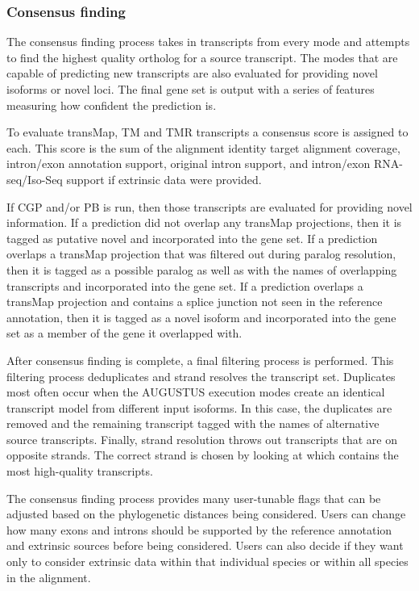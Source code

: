 \documentclass[fleqn,10pt]{wlscirep}
\begin{document}
\subsubsection*{Consensus finding}
	The consensus finding process takes in transcripts from every mode and attempts to find the highest quality ortholog for a source transcript. The modes that are capable of predicting new transcripts are also evaluated for providing novel isoforms or novel loci. The final gene set is output with a series of features measuring how confident the prediction is.
  
	To evaluate transMap, TM and TMR transcripts a consensus score is assigned to each. This score is the sum of the alignment identity target alignment coverage, intron/exon annotation support, original intron support, and intron/exon RNA-seq/Iso-Seq support if extrinsic data were provided.
  
	If CGP and/or PB is run, then those transcripts are evaluated for providing novel information. If a prediction did not overlap any transMap projections, then it is tagged as putative novel and incorporated into the gene set. If a prediction overlaps a transMap projection that was filtered out during paralog resolution, then it is tagged as a possible paralog as well as with the names of overlapping transcripts and incorporated into the gene set. If a prediction overlaps a transMap projection and contains a splice junction not seen in the reference annotation, then it is tagged as a novel isoform and incorporated into the gene set as a member of the gene it overlapped with.
  
	After consensus finding is complete, a final filtering process is performed. This filtering process deduplicates and strand resolves the transcript set. Duplicates most often occur when the AUGUSTUS execution modes create an identical transcript model from different input isoforms. In this case, the duplicates are removed and the remaining transcript tagged with the names of alternative source transcripts. Finally, strand resolution throws out transcripts that are on opposite strands. The correct strand is chosen by looking at which contains the most high-quality transcripts.
  
	The consensus finding process provides many user-tunable flags that can be adjusted based on the phylogenetic distances being considered. Users can change how many exons and introns should be supported by the reference annotation and extrinsic sources before being considered. Users can also decide if they want only to consider extrinsic data within that individual species or within all species in the alignment. 
\end{document}
